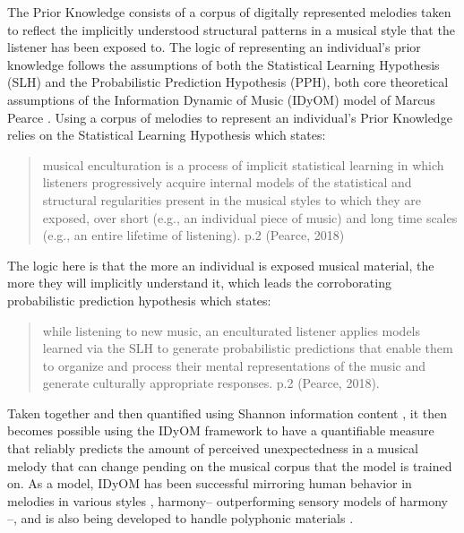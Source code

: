 \documentclass[12pt,]{book}
\begin{document}
The Prior Knowledge consists of a corpus of digitally represented melodies taken to reflect the implicitly understood structural patterns in a musical style that the listener has been exposed to.
The logic of representing an individual's prior knowledge follows the assumptions of both the Statistical Learning Hypothesis (SLH) and the Probabilistic Prediction Hypothesis (PPH), both core theoretical assumptions of the Information Dynamic of Music (IDyOM) model of Marcus Pearce \citep{pearceConstructionEvaluationStatistical2005, pearceStatisticalLearningProbabilistic2018a}.
Using a corpus of melodies to represent an individual's Prior Knowledge relies on the Statistical Learning Hypothesis which states:

\begin{quote}
musical enculturation is a process of implicit statistical learning in which listeners progressively acquire internal models of the statistical and structural regularities present in the musical styles to which they are exposed, over short (e.g., an individual piece of music) and long time scales (e.g., an entire lifetime of listening). p.2 (Pearce, 2018)
\end{quote}

The logic here is that the more an individual is exposed musical material, the more they will implicitly understand it, which leads the corroborating probabilistic prediction hypothesis which states:

\begin{quote}
while listening to new music, an enculturated listener applies models learned via the SLH to generate probabilistic predictions that enable them to organize and process their mental representations of the music and generate culturally appropriate responses. p.2 (Pearce, 2018).
\end{quote}

Taken together and then quantified using Shannon information content \citep{shannonMathematicalTheoryCommunication1948}, it then becomes possible using the IDyOM framework to have a quantifiable measure that reliably predicts the amount of perceived unexpectedness in a musical melody that can change pending on the musical corpus that the model is trained on.
As a model, IDyOM has been successful mirroring human behavior in melodies in various styles \citep{pearceStatisticalLearningProbabilistic2018a}, harmony-- outperforming \citep{harrisonDissociatingSensoryCognitive2018} sensory models of harmony \citep{bigandEmpiricalEvidenceMusical2014}--, and is also being developed to handle polyphonic materials \citep{sauvePredictionPolyphonyModelling2017}.
\end{document}
